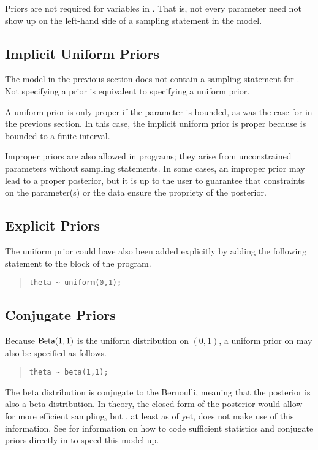 Priors are not required for variables in \Stan.  That is, not every
parameter need not show up on the left-hand side of a sampling
statement in the model.  

\subsection{Implicit Uniform Priors}

The model in the previous section does not contain a sampling
statement for .  Not specifying a prior is equivalent to
specifying a uniform prior.  

A uniform prior is only proper if the parameter is bounded, as was the
case for  in the previous section.  In this case, the
implicit uniform prior is proper because  is bounded to a
finite interval.

Improper priors are also allowed in \Stan programs; they arise from
unconstrained parameters without sampling statements.  In some cases,
an improper prior may lead to a proper posterior, but it is up to the
user to guarantee that constraints on the parameter(s) or the data
ensure the propriety of the posterior.

\subsection{Explicit Priors}

The uniform prior could have also been added explicitly by adding the
following statement to the  block of the program.
%
\begin{quote}
\begin{Verbatim} 
theta ~ uniform(0,1);
\end{Verbatim}
\end{quote}
% 

\subsection{Conjugate Priors}

Because $\mbox{\sf Beta}(1,1)$ is the uniform distribution on $(0,1)$,
a uniform prior on  may also be specified as follows.
%
\begin{quote}
\begin{Verbatim}
theta ~ beta(1,1);
\end{Verbatim}
\end{quote}
%
The beta distribution is conjugate to the Bernoulli, meaning that the
posterior is also a beta distribution.  In theory, the closed form of
the posterior would allow for more efficient sampling, but \Stan,
at least as of yet, does not make use of this information.  See
 for information on how to code sufficient
statistics and conjugate priors directly in \Stan to speed this model up.





